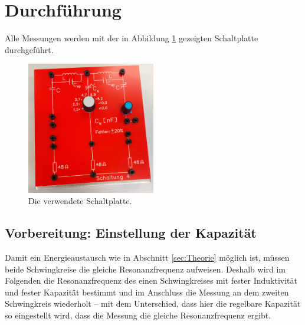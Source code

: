 \section{Durchführung}
\label{sec:Durchführung}
Alle Messungen werden mit der in Abbildung \ref{fig:platte}
gezeigten Schaltplatte durchgeführt. 
\begin{figure}
    \centering
    \includegraphics[width=0.5\textwidth]{plots/Platte.jpeg}
    \caption{Die verwendete Schaltplatte.}
    \label{fig:platte}
\end{figure}
\FloatBarrier

\subsection{Vorbereitung: Einstellung der Kapazität}
Damit ein Energieaustausch wie in Abschnitt \ref{sec:Theorie} möglich ist, müssen beide Schwingkreise die gleiche Resonanzfrequenz 
aufweisen. 
Deshalb wird im Folgenden die Resonanzfrequenz des einen Schwingkreises mit fester Induktivität und fester Kapazität bestimmt 
und im Anschluss die Messung an dem zweiten Schwingkreis wiederholt -- mit dem Unterschied, dass hier die regelbare Kapazität so
eingestellt wird, dass die Messung die gleiche Resonanzfrequenz ergibt. 

